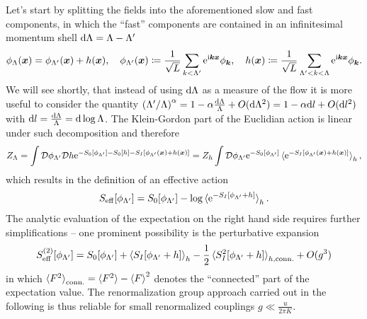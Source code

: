 Let's start by splitting the fields into the aforementioned slow and fast components, in which the ``fast'' components are contained in an infinitesimal momentum shell $\mathrm d\Lambda=\Lambda-\Lambda'$
\begin{align}
    \phi_\Lambda({\bm x}) = \phi_{\Lambda'}({\bm x}) + h({\bm x}),
    \quad
    \phi_{\Lambda'}({\bm x})\coloneqq\frac1{\sqrt L}\sum_{k<\Lambda'}\mathrm e^{\mathrm i {\bm k}{\bm x}}\phi_{\bm k},
    \quad
    h({\bm x}) \coloneqq \frac1{\sqrt L}\sum_{\Lambda'<k<\Lambda}\mathrm e^{\mathrm i {\bm k}{\bm x}}\phi_{\bm k}.
\end{align}
We will see shortly, that instead of using $\mathrm d\Lambda$ as a measure of the flow it is more useful to consider the quantity $\left( \Lambda'/\Lambda \right)^\alpha=1-\alpha\frac{\mathrm d\Lambda}\Lambda + O(\mathrm d\Lambda^2) = 1-\alpha\mathrm d l + O(\mathrm d l^2)$ with $\mathrm d l =\frac{\mathrm d\Lambda}\Lambda = \mathrm d\log\Lambda$.
The Klein-Gordon part of the Euclidian action is linear under such decomposition and therefore
\begin{align}
    Z_\Lambda
    = \int\mathcal D\phi_{\Lambda'}\mathcal D h \mathrm e^{-S_0[\phi_{\Lambda'}]-S_0[h]-S_I[\phi_{\Lambda'}({\bm x}) + h({\bm x})]}
    = Z_h\int\mathcal D\phi_{\Lambda'}\mathrm e^{-S_0[\phi_{\Lambda'}]}\braket{\mathrm e^{-S_I[\phi_{\Lambda'}({\bm x}) + h({\bm x})]}}_h,
\end{align}
which results in the definition of an effective action
\begin{align}
    S_{\rm eff}[\phi_{\Lambda'}] = S_0[\phi_{\Lambda'}] - \log\braket{\mathrm e^{-S_I[\phi_{\Lambda'}+h]}}_h.
\end{align}
The analytic evaluation of the expectation on the right hand side requires further simplifications -- one prominent possibility is the perturbative expansion
\begin{align}
    S^{(2)}_{\rm eff}[\phi_{\Lambda'}] = S_0[\phi_{\Lambda'}] + \braket{S_I[\phi_{\Lambda'}+h]}_h - \frac12\braket{S^2_I[\phi_{\Lambda'}+h]}_{h,{\rm conn.}} + O(g^3)
\end{align}
in which $\braket{F^2}_{\rm conn.} = \braket{F^2}-\braket{F}^2$ denotes the ``connected'' part of the expectation value.
The renormalization group approach carried out in the following is thus reliable for small renormalized couplings $g\ll \frac u{2\pi K}$.

